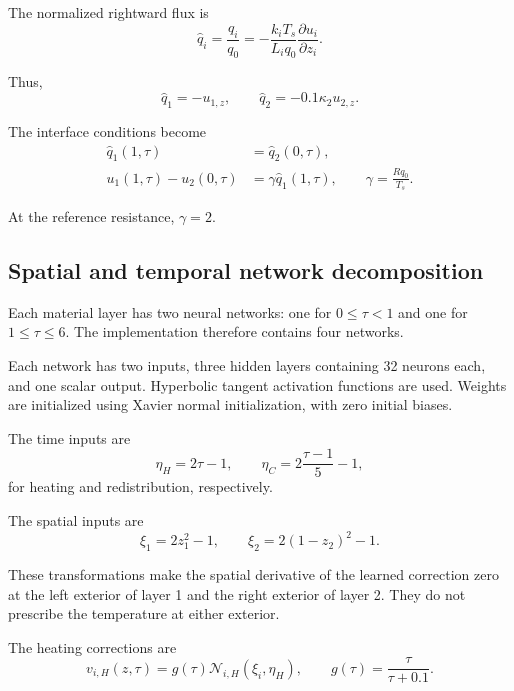 \documentclass[11pt,a4paper]{article}
\begin{document}
The normalized rightward flux is
\begin{equation}
\widehat q_i
=
\frac{q_i}{q_0}
=
-\frac{k_iT_s}{L_iq_0}
\frac{\partial u_i}{\partial z_i}.
\end{equation}

Thus,
\begin{equation}
\widehat q_1=-u_{1,z},
\qquad
\widehat q_2=-0.1\kappa_2u_{2,z}.
\end{equation}

The interface conditions become
\begin{align}
\widehat q_1(1,\tau)
  &=\widehat q_2(0,\tau),\\
u_1(1,\tau)-u_2(0,\tau)
  &=\gamma\widehat q_1(1,\tau),
\qquad
\gamma=\frac{Rq_0}{T_s}.
\end{align}

At the reference resistance, $\gamma=2$.

\subsection{Spatial and temporal network decomposition}

Each material layer has two neural networks: one for
$0\leq\tau<1$ and one for $1\leq\tau\leq6$.
The implementation therefore contains four networks.

Each network has two inputs, three hidden layers containing
32 neurons each, and one scalar output.
Hyperbolic tangent activation functions are used.
Weights are initialized using Xavier normal initialization,
with zero initial biases.

The time inputs are
\begin{equation}
\eta_H=2\tau-1,
\qquad
\eta_C=2\frac{\tau-1}{5}-1,
\end{equation}
for heating and redistribution, respectively.

The spatial inputs are
\begin{equation}
\xi_1=2z_1^2-1,
\qquad
\xi_2=2(1-z_2)^2-1.
\label{eq:spatialfeatures}
\end{equation}

These transformations make the spatial derivative of the
learned correction zero at the left exterior of layer 1
and the right exterior of layer 2.
They do not prescribe the temperature at either exterior.

The heating corrections are
\begin{equation}
v_{i,H}(z,\tau)
=
g(\tau)\mathcal{N}_{i,H}(\xi_i,\eta_H),
\qquad
g(\tau)=\frac{\tau}{\tau+0.1}.
\end{equation}
\end{document}
